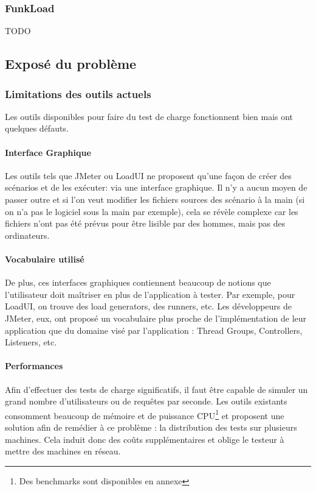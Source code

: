 \subsubsection{FunkLoad}
TODO

\subsection{Exposé du problème}
\subsubsection{Limitations des outils actuels}
Les outils disponibles pour faire du test de charge fonctionnent bien mais ont quelques défauts.
\paragraph{Interface Graphique}
Les outils tels que JMeter ou LoadUI ne proposent qu'une façon de créer des scénarios et de les exécuter: via une interface graphique. Il n'y a aucun moyen de passer outre et si l'on veut modifier les fichiers sources des scénario à la main (si on n'a pas le logiciel sous la main par exemple), cela se révèle complexe car les fichiers n'ont pas été prévus pour être lisible par des hommes, mais pas des ordinateurs.

\paragraph{Vocabulaire utilisé}
De plus, ces interfaces graphiques contiennent beaucoup de notions que l'utilisateur doit maîtriser en plus de l'application à tester. Par exemple, pour LoadUI, on trouve des load generators, des runners, etc. Les développeurs de JMeter, eux, ont proposé un vocabulaire plus proche de l'implémentation de leur application que du domaine visé par l'application : Thread Groups, Controllers, Listeners, etc.

\paragraph{Performances}
\label{pb_perfs}
Afin d'effectuer des tests de charge significatifs, il faut être capable de simuler un grand nombre d'utilisateurs ou de requêtes par seconde. Les outils existants consomment beaucoup de mémoire et de puissance CPU\footnote{Des benchmarks sont disponibles en annexe} et proposent une solution afin de remédier à ce problème : la distribution des tests sur plusieurs machines. Cela induit donc des coûts supplémentaires et oblige le testeur à mettre des machines en réseau.


